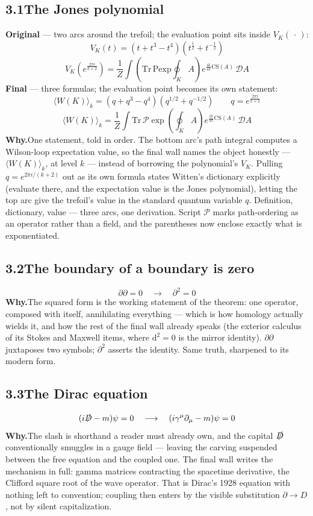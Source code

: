 \documentclass[10pt]{article}
\begin{document}
\subsection*{3.1\quad The Jones polynomial}
\textbf{Original} --- two arcs around the trefoil; the evaluation point
sits inside $V_K(\,\cdot\,)$:
\[ V_K(t) = (t + t^3 - t^4)\left(t^{\frac{1}{2}} + t^{-\frac{1}{2}}\right) \]
\[ V_K\!\left(e^{\frac{2\pi i}{k+2}}\right) = \frac{1}{Z}\int
   \left(\mathrm{Tr}\,\mathrm{Pexp}\oint_K A\right)
   e^{\frac{ik}{4\pi}\mathrm{CS}(A)}\,\mathcal{D}A \]
\textbf{Final} --- three formulas; the evaluation point becomes its own
statement:
\[ \langle W(K)\rangle_k = (q + q^3 - q^4)\left(q^{1/2} + q^{-1/2}\right)
   \qquad q = e^{\frac{2\pi i}{k+2}} \]
\[ \langle W(K)\rangle_k = \frac{1}{Z}\int
   \mathrm{Tr}\,\mathcal{P}\exp\!\left(\oint_K A\right)
   e^{\frac{ik}{4\pi}\mathrm{CS}(A)}\,\mathcal{D}A \]
\textbf{Why.}\enspace One statement, told in order. The bottom arc's
path integral computes a Wilson-loop expectation value, so the final
wall names the object honestly --- $\langle W(K)\rangle_k$, at level
$k$ --- instead of borrowing the polynomial's $V_K$. Pulling
$q = e^{2\pi i/(k+2)}$ out as its own formula states Witten's
dictionary explicitly (evaluate there, and the expectation value is the
Jones polynomial), letting the top arc give the trefoil's value in the
standard quantum variable $q$. Definition, dictionary, value --- three
arcs, one derivation. Script $\mathcal{P}$ marks path-ordering as an
operator rather than a field, and the parentheses now enclose exactly
what is exponentiated.

\subsection*{3.2\quad The boundary of a boundary is zero}
\[ \partial\partial = 0 \quad\longrightarrow\quad \partial^2 = 0 \]
\textbf{Why.}\enspace The squared form is the working statement of the
theorem: one operator, composed with itself, annihilating everything
--- which is how homology actually wields it, and how the rest of the
final wall already speaks (the exterior calculus of its Stokes and
Maxwell items, where $\mathrm{d}^2 = 0$ is the mirror identity).
$\partial\partial$ juxtaposes two symbols; $\partial^2$ asserts the
identity. Same truth, sharpened to its modern form.

\subsection*{3.3\quad The Dirac equation}
\[ (i\slashed{D} - m)\psi = 0 \quad\longrightarrow\quad
   (i\gamma^\mu \partial_\mu - m)\psi = 0 \]
\textbf{Why.}\enspace The slash is shorthand a reader must already own,
and the capital $\slashed{D}$ conventionally smuggles in a gauge field
--- leaving the carving suspended between the free equation and the
coupled one. The final wall writes the mechanism in full: gamma
matrices contracting the spacetime derivative, the Clifford square root
of the wave operator. That is Dirac's 1928 equation with nothing left
to convention; coupling then enters by the visible substitution
$\partial \rightarrow D$, not by silent capitalization.
\end{document}
